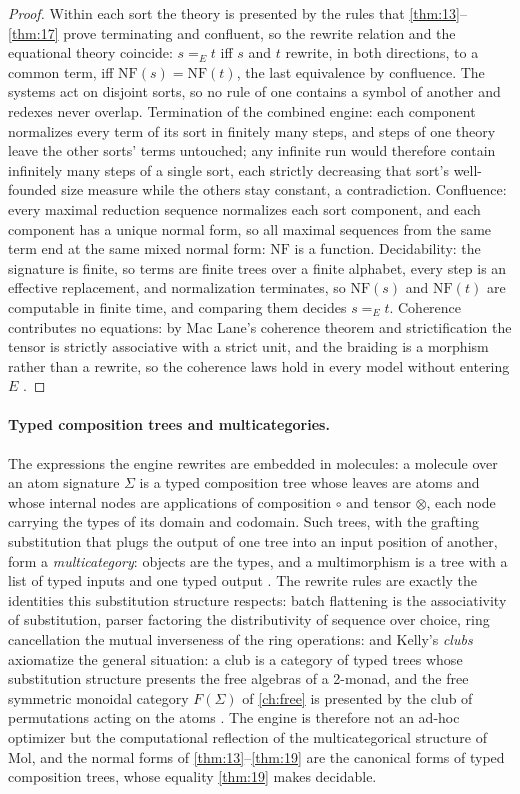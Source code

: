 \begin{proof}
Within each sort the theory is presented by the rules that
\autoref{thm:13}--\autoref{thm:17} prove terminating and confluent, so the
rewrite relation and the equational theory coincide: $s =_E t$ iff $s$ and
$t$ rewrite, in both directions, to a common term, iff $\mathrm{NF} (s) =
\mathrm{NF} (t)$, the last equivalence by confluence. The systems act on
disjoint sorts, so no rule of one contains a symbol of another and redexes
never overlap. Termination of the combined engine: each component
normalizes every term of its sort in finitely many steps, and steps of one
theory leave the other sorts' terms untouched; any infinite run would
therefore contain infinitely many steps of a single sort, each strictly
decreasing that sort's well-founded size measure while the others stay
constant, a contradiction. Confluence: every maximal reduction sequence
normalizes each sort component, and each component has a unique normal
form, so all maximal sequences from the same term end at the same mixed
normal form: $\mathrm{NF}$ is a function. Decidability: the signature is
finite, so terms are finite trees over a finite alphabet, every step is an
effective replacement, and normalization terminates, so $\mathrm{NF} (s)$
and $\mathrm{NF} (t)$ are computable in finite time, and comparing them
decides $s =_E t$. Coherence contributes no equations: by Mac Lane's
coherence theorem and strictification the tensor is strictly associative
with a strict unit, and the braiding is a morphism rather than a rewrite,
so the coherence laws hold in every model without entering $E$
\cite{maclane}.
\end{proof}

\paragraph{Typed composition trees and multicategories.}
The expressions the engine rewrites are embedded in molecules: a molecule
over an atom signature $\Sigma$ is a typed composition tree whose leaves
are atoms and whose internal nodes are applications of composition $\circ$
and tensor $\otimes$, each node carrying the types of its domain and
codomain. Such trees, with the grafting substitution that plugs the output
of one tree into an input position of another, form a \emph{multicategory}:
objects are the types, and a multimorphism is a tree with a list of typed
inputs and one typed output \cite{leinster}. The rewrite rules are exactly
the identities this substitution structure respects: batch flattening is
the associativity of substitution, parser factoring the distributivity of
sequence over choice, ring cancellation the mutual inverseness of the ring
operations: and Kelly's \emph{clubs} axiomatize the general situation: a
club is a category of typed trees whose substitution structure presents the
free algebras of a 2-monad, and the free symmetric monoidal category
$F (\Sigma)$ of \autoref{ch:free} is presented by the club of permutations
acting on the atoms \cite{kelly, leinster}. The engine is therefore not an
ad-hoc optimizer but the computational reflection of the multicategorical
structure of Mol, and the normal forms of \autoref{thm:13}--\autoref{thm:19} are the canonical
forms of typed composition trees, whose equality \autoref{thm:19} makes decidable.
